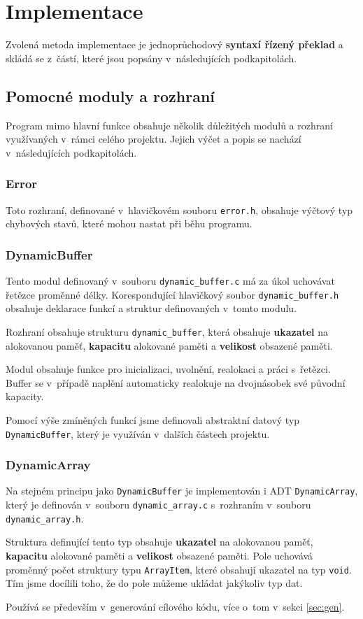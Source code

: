 \documentclass[a4paper, 11pt]{article}
\begin{document}
	\section{Implementace}
	Zvolená metoda implementace je jednoprůchodový \textbf{syntaxí řízený překlad} a skládá se z~částí, které jsou popsány v~následujících podkapitolách.

	\subsection{Pomocné moduly a rozhraní}
	Program mimo hlavní funkce obsahuje několik důležitých modulů a rozhraní využívaných v~rámci celého projektu. Jejich výčet a popis se nachází v~následujících podkapitolách.
	\subsubsection{Error}
	Toto rozhraní, definované v~hlavičkovém souboru \texttt{error.h}, obsahuje výčtový typ chybových stavů, které mohou nastat při běhu programu.


	\subsubsection{DynamicBuffer}
	Tento modul definovaný v~souboru \texttt{dynamic\_buffer.c} má za úkol uchovávat řetězce proměnné délky.
	Korespondující hlavičkový soubor \texttt{dynamic\_buffer.h} obsahuje deklarace funkcí a struktur definovaných v~tomto modulu.
	\par\noindent Rozhraní obsahuje strukturu \texttt{dynamic\_buffer}, která obsahuje \textbf{ukazatel} na alokovanou paměť, \textbf{kapacitu} alokované paměti a \textbf{velikost} obsazené paměti.
	\par\noindent Modul obsahuje funkce pro inicializaci, uvolnění, realokaci a práci s~řetězci. Buffer se v~případě naplění automaticky realokuje na dvojnásobek své původní kapacity.
	\par\noindent Pomocí výše zmíněných funkcí jsme definovali abstraktní datový typ \texttt{DynamicBuffer}, který je využíván v~dalších částech projektu.


	\subsubsection{DynamicArray}
	Na stejném principu jako \texttt{DynamicBuffer} je implementován i ADT \texttt{DynamicArray}, který je definován v~souboru \texttt{dynamic\_array.c} s~rozhraním v~souboru \texttt{dynamic\_array.h}.
	\par\noindent Struktura definující tento typ obsahuje \textbf{ukazatel} na alokovanou paměť, \textbf{kapacitu} alokované paměti a \textbf{velikost} obsazené paměti. Pole uchovává proměnný počet struktury typu \texttt{ArrayItem}, které obsahují ukazatel na typ \texttt{void}. Tím jsme docílili toho, že do pole můžeme ukládat jakýkoliv typ dat.
	\par\noindent Používá se především v~generování cílového kódu, více o~tom v~sekci \ref{sec:gen}.
\end{document}
